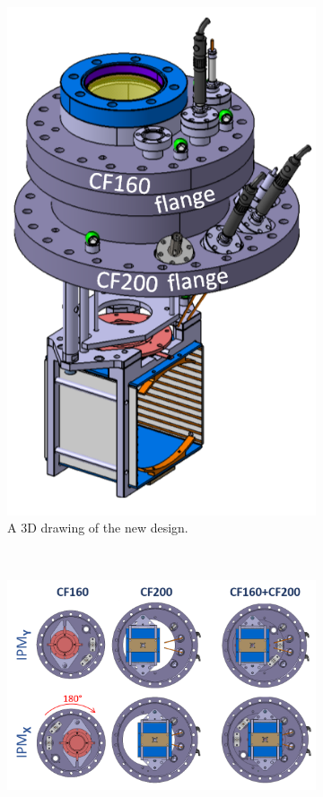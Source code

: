 \begin{figure}[!ht]
	\begin{subfigure}[t]{0.25\textwidth}
		\includegraphics[width=\textwidth]{05_Conclusion/figures/fig000_bride_double2_a}
		\caption{A 3D drawing of the new design.}
		\label{}
	\end{subfigure}
	~
	\begin{subfigure}[t]{0.75\textwidth}
		\includegraphics[width=\textwidth]{05_Conclusion/figures/fig000_bride_double2_b}

\end{subfigure}
\end{figure}
